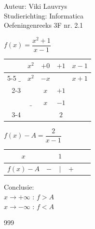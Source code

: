 \documentclass[a4paper]{article}
\begin{document}
  
\noindent \large Auteur: Viki Lauvrys        \\
\noindent \large Studierichting: Informatica \\
\noindent \large Oefeningenreeks 3F nr. 2.1 \\

\medskip

\normalsize

$ f(x) = \dfrac{x^2 +1}{x-1} $ \\

\bigskip

\begin{tabular}{rccc|l}
     & $x^2$ & $+0$  & $+1$         & $x-1$  \\ \cline{5-5} 
$\_$ & $x^2$ & $-x$ &              & $x+1$ \\ \cline{2-3}
     &          & $x$  & $+1$         &        \\
     & $\_$     & $x$  & $-1$         &        \\ \cline{3-4}
     &          &       & $2$          &        \\ 
\end{tabular}

\bigskip

$ f(x) - A = \dfrac{2}{x - 1}$ \\

\bigskip

\begin{tabular}{c|ccccc}
$x$				 &     & $1$ &     & \\ \hline
$f(x) - A$ & $-$ & $|$ & $+$ & \\
\end{tabular}

\bigskip

Conclusie: \\

$ x \rightarrow +\infty $ : $ f > A $ \\ 

$ x \rightarrow -\infty $ : $ f < A $ \\

\begin{thebibliography}{999}
\end{thebibliography}
\end{document}
